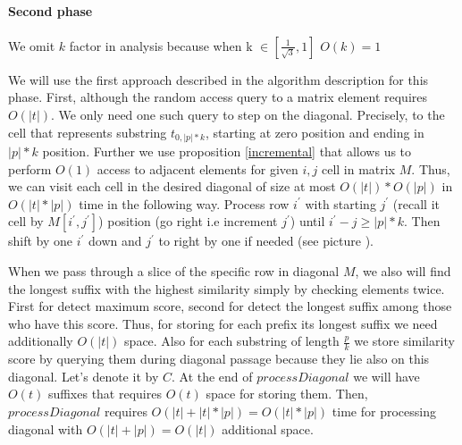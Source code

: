   





\paragraph{Second phase}
We omit $k$ factor in analysis because when k $\in [\frac{1}{\sqrt{3}},1]$ $O(k) = 1$

We will use the first approach described in the algorithm description for this phase.
First, although the random access query to a matrix element requires $O(|t|)$.
We only need one such query to step on the diagonal.
Precisely, to the cell that represents substring $t_{0,|p|*k}$, starting at zero position and ending in $|p|*k$ position.  
Further we use  proposition \ref{incremental} that allows us to perform $O(1)$ access to adjacent elements for given $i,j$ cell in matrix $M$.
Thus, we can visit each cell in the desired diagonal of size at most $O(|t|) * O(|p|) $ in $O(|t|*|p|)$ time in the following way.
Process row $i^{'}$ with starting $j^{'}$ (recall it cell by $M[i^{'},j^{'}]$) position  (go right i.e increment $j^{'}$) until $i^{'}-j \geq |p|*k$.
Then shift by one $i^{'}$ down and $j^{'}$ to right by one if needed (see picture ).

When we pass through a slice of the specific row in diagonal $M$,  we also will find the longest suffix with the highest similarity simply by checking elements twice.
First for detect maximum score, second for detect the longest suffix among those who have this score.
Thus, for storing for each prefix its longest suffix we need additionally $O(|t|)$ space.
Also for each substring of length $\frac{p}{k}$ we store similarity score by querying them during diagonal passage because they lie also on this diagonal.
Let's denote it by $C$. 
At the end of  $processDiagonal$ we will have $O(t)$ suffixes that requires $O(t)$  space for storing them.
Then, $processDiagonal$ requires $O(|t|+|t|*|p|)=O(|t|*|p|)$ time for processing diagonal with $O(|t|+|p|)=O(|t|)$ additional space.
 

